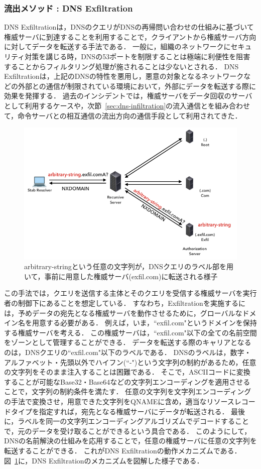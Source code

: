 \subsubsection{流出メソッド : DNS Exfiltration}
\label{sec:dns-exfiltration}
DNS Exfiltrationは，DNSのクエリがDNSの再帰問い合わせの仕組みに基づいて権威サーバに到達することを利用することで，クライアントから権威サーバ方向に対してデータを転送する手法である．
一般に，組織のネットワークにセキュリティ対策を講じる時，DNSの53ポートを制限することは極端に利便性を阻害することからフィルタリング処理が施されることは少ないとされる．
DNS Exfiltrationは，上記のDNSの特性を悪用し，悪意の対象となるネットワークなどの外部との通信が制限されている環境において，外部にデータを転送する際に効果を発揮する．
過去のインシデントでは，権威サーバをデータ回収のサーバとして利用するケースや，次節~\ref{sec:dns-infiltration}の流入通信とを組み合わせて，命令サーバとの相互通信の流出方向の通信手段として利用されてきた．
\begin{figure}[h]
 \centering
 \includegraphics[width=12.0cm]{figure/dns-exfiltration.png}
 \caption{arbitrary-stringという任意の文字列が，DNSクエリのラベル部を用いて，事前に用意した権威サーバ(exfil.com)に転送される様子}
 \label{fig:dns-exfiltration}
\end{figure}
この手法では，クエリを送信する主体とそのクエリを受信する権威サーバを実行者の制御下にあることを想定している．
すなわち，Exfiltrationを実施するには，予めデータの宛先となる権威サーバを動作させるために，グローバルなドメイン名を用意する必要がある．
例えば，いま，``exfil.com"というドメインを保持する権威サーバを考える．
この権威サーバは，``exfil.com"以下の全ての名前空間をゾーンとして管理することができる．
データを転送する際のキャリアとなるのは，DNSクエリの``exfil.com"以下のラベルである．
DNSのラベルは，数字・アルファベット・先頭以外でハイフン(``-")という文字列の制約があるため，任意の文字列をそのまま注入することは困難である．
そこで，ASCIIコードに変換することが可能なBase32・Base64などの文字列エンコーディングを適用させることで，文字列の制約条件を満たす．
任意の文字列を文字列エンコーディングの手法で変換させ，用意できた文字列をQNAMEに含め，適当なリソースレコードタイプを指定すれば，宛先となる権威サーバにデータが転送される．
最後に，ラベルを同一の文字列エンコーディングアルゴリズムでデコードすることで，元のデータを受け取ることができるという具合である．
このようにして，DNSの名前解決の仕組みを応用することで，任意の権威サーバに任意の文字列を転送することができる．
これがDNS Exfiltrationの動作メカニズムである．
図~\ref{fig:dns-exfiltration}に，DNS Exfiltrationのメカニズムを図解した様子である．


